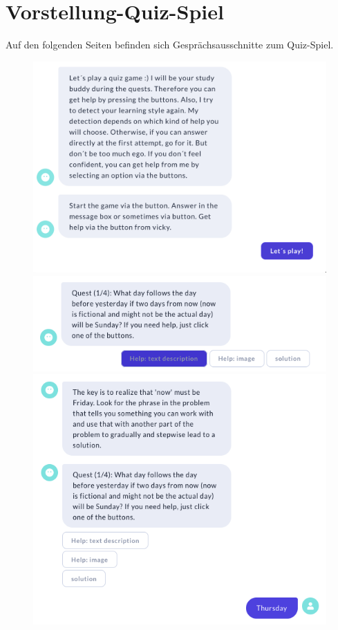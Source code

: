 \section{Vorstellung-Quiz-Spiel}\label{AusschnitteQuizSpiel}

Auf den folgenden Seiten befinden sich Gesprächsausschnitte zum Quiz-Spiel.
\begin{figure}[H]
  \centering
  \includegraphics[width=0.65\linewidth]{images/VickyQuiz/gamestart.png}
  \includegraphics[width=0.65\linewidth]{images/VickyQuiz/Q0.png}
  \includegraphics[width=0.65\linewidth]{images/Game/q1.1.png}
  \label{fig:Game_I}
\end{figure} 
